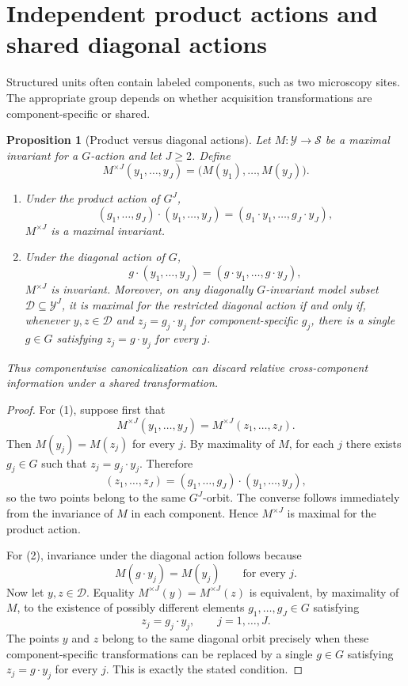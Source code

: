 \documentclass[11pt]{article}
\theoremstyle{plain}
\newtheorem{proposition}[theorem]{Proposition}
\theoremstyle{definition}
\numberwithin{equation}{section}
\newcommand{\1}{\mathbf 1}
\newcommand{\calD}{\mathcal D}
\newcommand{\calS}{\mathcal S}
\newcommand{\calY}{\mathcal Y}
\begin{document}
\section{Independent product actions and shared diagonal actions}\label{sec:multi}

Structured units often contain labeled components, such as two microscopy sites. The appropriate group depends on whether acquisition transformations are component-specific or shared.

\begin{proposition}[Product versus diagonal actions]\label{prop:product-diagonal}
Let $M:\calY\to\calS$ be a maximal invariant for a $G$-action and let $J\ge2$. Define
\[
M^{\times J}(y_1,\ldots,y_J)=\bigl(M(y_1),\ldots,M(y_J)\bigr).
\]
\begin{enumerate}
\item Under the product action of $G^J$,
\[
(g_1,\ldots,g_J)\cdot(y_1,\ldots,y_J)=(g_1\cdot y_1,\ldots,g_J\cdot y_J),
\]
$M^{\times J}$ is a maximal invariant.
\item Under the diagonal action of $G$,
\[
g\cdot(y_1,\ldots,y_J)=(g\cdot y_1,\ldots,g\cdot y_J),
\]
$M^{\times J}$ is invariant. Moreover, on any diagonally
$G$-invariant model subset $\calD\subseteq\calY^J$, it is maximal
for the restricted diagonal action if and only if, whenever $y,z\in\calD$ and $z_j=g_j\cdot y_j$ for component-specific $g_j$, there is a single $g\in G$ satisfying $z_j=g\cdot y_j$ for every $j$.
\end{enumerate}
Thus componentwise canonicalization can discard relative cross-component information under a shared transformation.
\end{proposition}

\begin{proof}
For (1), suppose first that
\[
M^{\times J}(y_1,\ldots,y_J)
=
M^{\times J}(z_1,\ldots,z_J).
\]
Then $M(y_j)=M(z_j)$ for every $j$. By maximality of $M$, for each
$j$ there exists $g_j\in G$ such that $z_j=g_j\cdot y_j$. Therefore
\[
(z_1,\ldots,z_J)
=
(g_1,\ldots,g_J)\cdot(y_1,\ldots,y_J),
\]
so the two points belong to the same $G^J$-orbit. The converse follows
immediately from the invariance of $M$ in each component. Hence
$M^{\times J}$ is maximal for the product action.

For (2), invariance under the diagonal action follows because
\[
M(g\cdot y_j)=M(y_j)
\qquad\text{for every }j.
\]
Now let $y,z\in\calD$. Equality
$M^{\times J}(y)=M^{\times J}(z)$ is equivalent, by maximality of
$M$, to the existence of possibly different elements
$g_1,\ldots,g_J\in G$ satisfying
\[
z_j=g_j\cdot y_j,\qquad j=1,\ldots,J.
\]
The points $y$ and $z$ belong to the same diagonal orbit precisely
when these component-specific transformations can be replaced by a
single $g\in G$ satisfying $z_j=g\cdot y_j$ for every $j$. This is
exactly the stated condition.
\end{proof}
\end{document}
